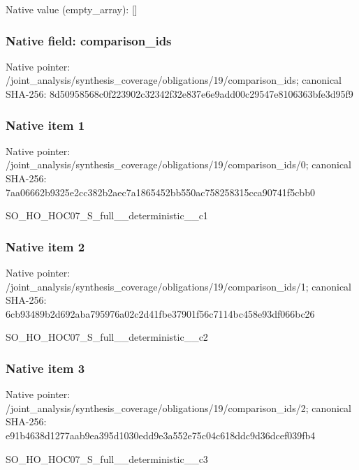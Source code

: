 \documentclass[10pt,a4paper]{article}
\begin{document}
Native value (empty\_\allowbreak{}array): []

\subsubsection{Native field: comparison\_\allowbreak{}ids}
Native pointer: /joint\_\allowbreak{}analysis/synthesis\_\allowbreak{}coverage/obligations/19/comparison\_\allowbreak{}ids; canonical SHA-256: 8d50958568c0f223902c32342f32e837e6e9add00c29547e8106363bfe3d95f9

\subsubsection{Native item 1}
Native pointer: /joint\_\allowbreak{}analysis/synthesis\_\allowbreak{}coverage/obligations/19/comparison\_\allowbreak{}ids/0; canonical SHA-256: 7aa06662b9325e2cc382b2aec7a1865452bb550ac758258315cca90741f5cbb0

\begingroup\raggedright\sloppy SO\_\allowbreak{}HO\_\allowbreak{}HOC07\_\allowbreak{}S\_\allowbreak{}full\_\allowbreak{}\_\allowbreak{}deterministic\_\allowbreak{}\_\allowbreak{}c1\par\endgroup

\subsubsection{Native item 2}
Native pointer: /joint\_\allowbreak{}analysis/synthesis\_\allowbreak{}coverage/obligations/19/comparison\_\allowbreak{}ids/1; canonical SHA-256: 6cb93489b2d692aba795976a02c2d41fbe37901f56c7114bc458e93df066bc26

\begingroup\raggedright\sloppy SO\_\allowbreak{}HO\_\allowbreak{}HOC07\_\allowbreak{}S\_\allowbreak{}full\_\allowbreak{}\_\allowbreak{}deterministic\_\allowbreak{}\_\allowbreak{}c2\par\endgroup

\subsubsection{Native item 3}
Native pointer: /joint\_\allowbreak{}analysis/synthesis\_\allowbreak{}coverage/obligations/19/comparison\_\allowbreak{}ids/2; canonical SHA-256: e91b4638d1277aab9ea395d1030edd9e3a552e75c04c618ddc9d36dcef039fb4

\begingroup\raggedright\sloppy SO\_\allowbreak{}HO\_\allowbreak{}HOC07\_\allowbreak{}S\_\allowbreak{}full\_\allowbreak{}\_\allowbreak{}deterministic\_\allowbreak{}\_\allowbreak{}c3\par\endgroup
\end{document}
